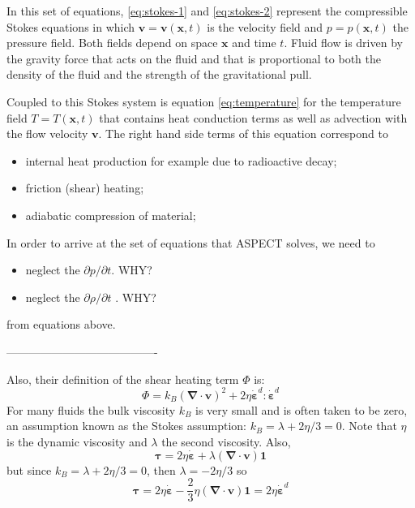 In this set of equations, \eqref{eq:stokes-1} and \eqref{eq:stokes-2}
represent the compressible Stokes equations in which $\mathbf v=\mathbf
v(\mathbf x,t)$ is the velocity field and $p=p(\mathbf x,t)$ the pressure
field. Both fields depend on space $\mathbf x$ and time $t$. Fluid flow is
driven by the gravity force that acts on the fluid and that is proportional to
both the density of the fluid and the strength of the gravitational pull.

Coupled to this Stokes system is equation \eqref{eq:temperature} for the
temperature field $T=T(\mathbf x,t)$ that contains heat conduction terms as
well as advection with the flow velocity $\mathbf v$. The right hand side
terms of this equation correspond to
\begin{itemize}
\item internal heat production for example due to radioactive decay;
\item friction (shear) heating;
\item adiabatic compression of material;
\end{itemize}

In order to arrive at the set of equations that ASPECT solves, 
we need to 
\begin{itemize}
\item neglect the $\partial p/\partial t$. {\color{red}WHY?}
\item neglect the $\partial \rho / \partial t$ . {\color{red}WHY?}
\end{itemize}
from equations above. 

----------------------------------------

Also, their definition of the shear heating term $\Phi$ is:
\[
\Phi = k_B ({\bm \nabla}\cdot{\bm v})^2 + 2\eta \dot{\bm \varepsilon}^d:\dot{\bm \varepsilon}^d
\]
For many fluids the bulk viscosity $k_B$ is very small and is often taken to be zero, an assumption known
as the Stokes assumption: $k_B=\lambda+2\eta/3=0$. 
Note that $\eta$ is the dynamic viscosity and $\lambda$ the second viscosity. 
Also, 
\[
{\bm \tau}=2\eta \dot{\bm \varepsilon} + \lambda ({\bm \nabla}\cdot{\bm v}) {\bm 1}
\]
but since $k_B=\lambda+2\eta/3=0$, then $\lambda=-2\eta/3$ so 
\[
{\bm \tau}=2\eta \dot{\bm \varepsilon} -\frac{2}{3}\eta ({\bm \nabla}\cdot{\bm v}) {\bm 1} = 2\eta \dot{\bm \varepsilon}^d
\]







